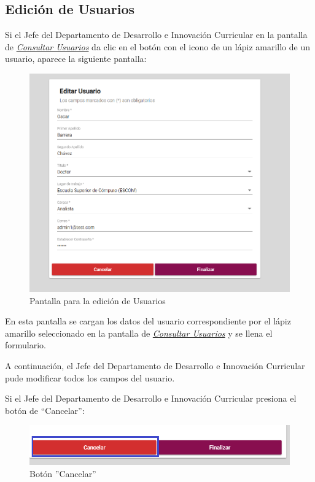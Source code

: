 \newpage

\hypertarget{editar-user-JDDIC}{}
\subsection{Edición de Usuarios}
Si el Jefe del Departamento de Desarrollo e Innovación Curricular en la pantalla de \hyperlink{consultarUs-JDDIC}{\textit{Consultar Usuarios}} da clic en el botón con el icono de un lápiz amarillo de un usuario, aparece la siguiente pantalla:

\begin{figure}[H]
	\centering
	\hypertarget{editarUs-JDDIC}{\includegraphics[width=0.6\linewidth]{images/SP5/Editar-Usuario}}
	\caption{Pantalla para la edición de Usuarios}
	\label{editarrh-JDDIC}
\end{figure}

En esta pantalla se cargan los datos del usuario correspondiente por el lápiz amarillo seleccionado en la pantalla de \hyperlink{consultarUs-JDDIC}{\textit{Consultar Usuarios}} y se llena el formulario.

A continuación, el Jefe del Departamento de Desarrollo e Innovación Curricular pude modificar todos los campos del usuario.

Si el Jefe del Departamento de Desarrollo e Innovación Curricular presiona el botón de “Cancelar”:

\begin{figure}[H]
	\centering
	\hypertarget{cancel2-JDDIC}{\includegraphics[width=0.7\linewidth]{images/SP5/BtnCancelar2}}
	\caption{Botón ''Cancelar''}
	\label{cancel2-JDDIC}
\end{figure}

